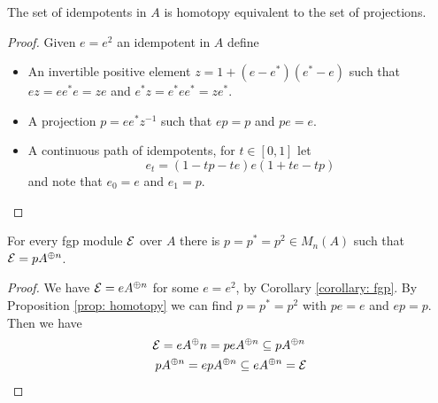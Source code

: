 \begin{proposition}\label{prop: homotopy}
 The set of idempotents in $A$ is homotopy equivalent to the set of projections. 
\end{proposition}
\begin{proof}
 Given $e=e^2$ an idempotent in $A$ define
 \begin{itemize}
  \item An invertible positive  element $z=1+(e-e^\ast)(e^\ast-e)$ such that $ez=ee^\ast e=ze$ and $e^\ast z=e^\ast ee^\ast=ze^\ast$.
  \item A projection $p=ee^\ast z^{-1}$ such that $ep=p$ and $pe=e$.
  \item A continuous path of idempotents, for $t\in[0,1]$ let $$e_t=(1-tp-te)e(1+te-tp)$$ and note that $e_0=e$ and $e_1=p$.
 \end{itemize}
\end{proof}

\begin{corollary}
 For every fgp module $\mathcal{E}$ over $A$ there is $p=p^\ast=p^2\in M_n(A)$ such that $\mathcal{E}=pA^{\oplus n}$.
\end{corollary}
\begin{proof}
 We have $\mathcal{E}=eA^{\oplus n}$ for some $e=e^2$, by Corollary \eqref{corollary: fgp}. By Proposition \eqref{prop: homotopy} we can find $p=p^\ast=p^2$ with $pe=e$ and $ep=p$. Then we have 
 \begin{align*} 
  \mathcal{E}=eA{^\oplus n}=peA^{\oplus n}&\subseteq pA^{\oplus n} \\
  pA^{\oplus n}=epA^{\oplus n}\subseteq e&A^{\oplus n}=\mathcal{E}
 \end{align*}
\end{proof}

